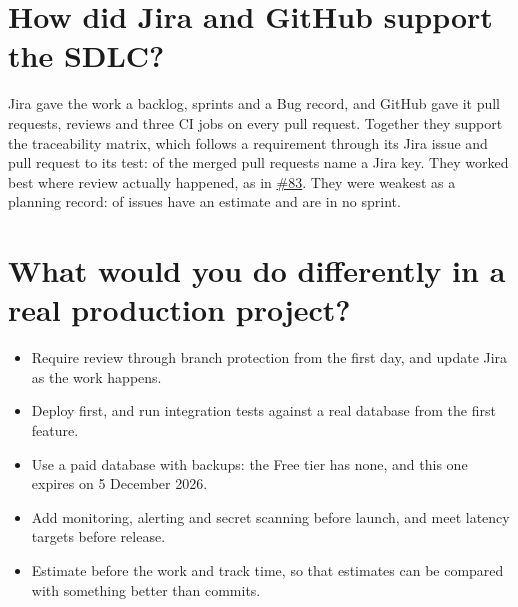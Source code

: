 \documentclass[10pt]{article}
\newcommand{\repourl}{https://github.com/CS455-Carpooling/Campus_Ridepooling_Automation}
\newcommand{\pr}[1]{\href{\repourl/pull/#1}{\##1}}
\begin{document}
\section{How did Jira and GitHub support the SDLC?}
Jira gave the work a backlog, sprints and a Bug record, and GitHub gave it pull requests, reviews and three CI jobs on
every pull request. Together they support the traceability matrix, which follows a requirement through its Jira issue
and pull request to its test: \PullsWithJira{} of the \PullsMerged{} merged pull requests name a Jira key. They worked
best where review actually happened, as in \pr{83}. They were weakest as a planning record: \JiraWithEstimate{} of
\JiraIssues{} issues have an estimate and \JiraNoSprint{} are in no sprint.

\section{What would you do differently in a real production project?}
\begin{itemize}
  \item Require review through branch protection from the first day, and update Jira as the work happens.
  \item Deploy first, and run integration tests against a real database from the first feature.
  \item Use a paid database with backups: the Free tier has none, and this one expires on 5 December 2026.
  \item Add monitoring, alerting and secret scanning before launch, and meet latency targets before release.
  \item Estimate before the work and track time, so that estimates can be compared with something better than commits.
\end{itemize}
\end{document}
